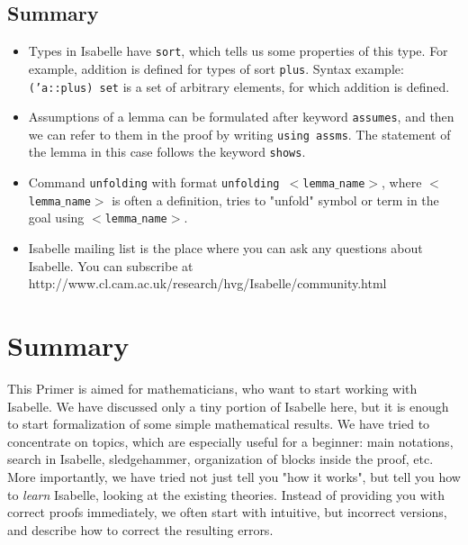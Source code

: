 \documentclass[11pt]{article}
\begin{document}
\subsection{Summary}

\begin{itemize}

    \item Types in Isabelle have {\tt sort}, which tells us some properties of this type. For example, addition is defined for types of sort {\tt plus}. Syntax example: {\tt ('a::plus) set} is a set of arbitrary elements, for which addition is defined.

    \item Assumptions of a lemma can be formulated after keyword {\tt assumes}, and then we can refer to them in the proof by writing {\tt using assms}. The statement of the lemma in this case follows the keyword {\tt shows}.

    \item Command {\tt unfolding} with format {\tt unfolding $<$lemma$\_$name$>$}, where {\tt $<$lemma$\_$name$>$} is often a definition, tries to "unfold" symbol or term in the goal using {\tt $<$lemma$\_$name$>$}.

    \item Isabelle mailing list is the place where you can ask any questions about Isabelle. You can subscribe at http://www.cl.cam.ac.uk/research/hvg/Isabelle/community.html

\end{itemize}


\section{Summary}

This Primer is aimed for mathematicians, who want to start working with Isabelle. We have discussed only a tiny portion of Isabelle here, but it is enough to start formalization of some simple mathematical results. We have tried to concentrate on topics, which are especially useful for a beginner: main notations, search in Isabelle, sledgehammer, organization of blocks inside the proof, etc. More importantly, we have tried not just tell you "how it works", but tell you how to \emph{learn} Isabelle, looking at the existing theories. Instead of providing you with correct proofs immediately, we often start with intuitive, but incorrect versions, and describe how to correct the resulting errors.
\end{document}
